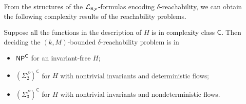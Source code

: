 \documentclass[12pt]{article}
\begin{document}
From the structures of the $\mathcal{L}_{\mathbb{R}_{\mathcal{F}}}$-formulas encoding $\delta$-reachability, we can obtain the following complexity results of the reachability problems.
\begin{theorem}[Complexity]
Suppose all the functions in the description of $H$ is in complexity class $\mathsf{C}$. Then deciding the $(k,M)$-bounded $\delta$-reachability problem is in
\begin{itemize}
\item $\mathsf{NP}^{\mathsf{C}}$ for an invariant-free $H$;
\item $(\Sigma_2^P)^{\mathsf{C}}$ for $H$ with nontrivial invariants and deterministic flows;
\item $(\Sigma_3^P)^{\mathsf{C}}$ for $H$ with nontrivial invariants and nondeterministic flows.
\end{itemize}
\end{theorem}
\end{document}
